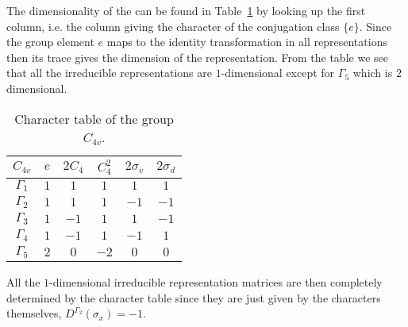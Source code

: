 The dimensionality of the \irr can be found in Table~\ref{tab:Group:Symm:characterTable} by looking up the first column, i.e. the column giving
the character of the conjugation class $\{e\}$.
Since the group element $e$ maps to the identity transformation in all representations then its
trace gives the dimension of the representation. From the table we see that all the irreducible representations are $1$-dimensional except for
$\Gamma_5$ which is $2$ dimensional.
\begin{table}
    \centering
    \caption{Character table of the group $C_{4v}$.}
    \begin{tabular}{c|ccccc}
        $C_{4v}$ & $e$ & $2C_4$ & $C_4^2$ & $2\sigma_v$ & $2\sigma_d$\\ \hline
        $\Gamma_1$ & $1$ & $1$ & $1$ & $1$ & $1$\\
        $\Gamma_2$ & $1$ & $1$ & $1$ & $-1$ & $-1$\\
        $\Gamma_3$ & $1$ & $-1$ & $1$ & $1$ & $-1$\\
        $\Gamma_4$ & $1$ & $-1$ & $1$ & $-1$ & $1$\\
        $\Gamma_5$ & $2$ & $0$ & $-2$ & $0$ & $0$
    \end{tabular}
    \label{tab:Group:Symm:characterTable}
\end{table}
All the $1$-dimensional irreducible representation matrices are then completely determined by the character table since they are just given by
the characters themselves, \ie $D^{\Gamma_2}(\sigma_x) = -1$.

